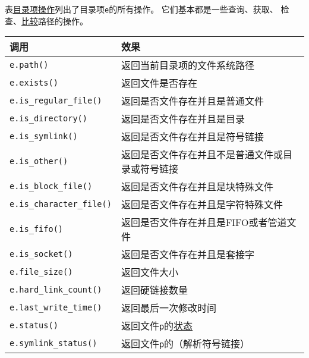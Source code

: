 表\hyperref[t20.22]{目录项操作}列出了目录项\texttt{e}的所有操作。
它们基本都是一些查询、获取、
检查、\hyperref[ch20.3.6]{比较}路径的操作。
\begin{table}[htb]
    \centering
    \begin{tabular}{l|l}
        \hline
        \textbf{调用}                      & \textbf{效果}                                \\
        \hline
        \texttt{e.path()}                & 返回当前目录项的文件系统路径                             \\
        \texttt{e.exists()}              & 返回文件是否存在                                   \\
        \texttt{e.is\_regular\_file()}   & 返回是否文件存在并且是普通文件                            \\
        \texttt{e.is\_directory()}       & 返回是否文件存在并且是目录                              \\
        \texttt{e.is\_symlink()}         & 返回是否文件存在并且是符号链接                            \\
        \texttt{e.is\_other()}           & 返回是否文件存在并且不是普通文件或目录或符号链接                   \\
        \texttt{e.is\_block\_file()}     & 返回是否文件存在并且是块特殊文件                           \\
        \texttt{e.is\_character\_file()} & 返回是否文件存在并且是字符特殊文件                          \\
        \texttt{e.is\_fifo()}            & 返回是否文件存在并且是FIFO或者管道文件                      \\
        \texttt{e.is\_socket()}          & 返回是否文件存在并且是套接字                             \\
        \texttt{e.file\_size()}          & 返回文件大小                                     \\
        \texttt{e.hard\_link\_count()}   & 返回硬链接数量                                    \\
        \texttt{e.last\_write\_time()}   & 返回最后一次修改时间                                 \\
        \texttt{e.status()}              & 返回文件\texttt{p}的\hyperref[ch20.4.2]{状态}     \\
        \texttt{e.symlink\_status()}     & 返回文件\texttt{p}的\nameref{ch20.4.2}（解析符号链接）  \\

\end{tabular}
\end{table}
